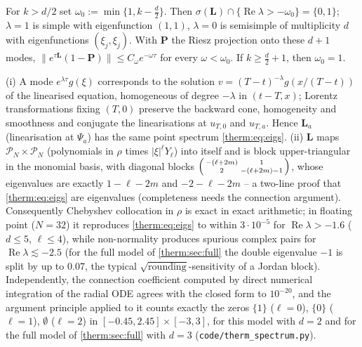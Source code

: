 \begin{corollary}\label{therm:cor:gap}
For $k>d/2$ set $\omega_0:=\min\{1,k-\frac d2\}$.  Then
$\sigma(\mathbf L)\cap\{\operatorname{Re}\lambda>-\omega_0\}=\{0,1\}$; $\lambda=1$ is simple with eigenfunction
$(1,1)$, $\lambda=0$ is semisimple of multiplicity $d$ with eigenfunctions
$(\xi_j,\xi_j)$.  With $\mathbf P$ the Riesz projection onto these $d+1$ modes,
$\|e^{\tau\mathbf L}(1-\mathbf P)\|\le C_\omega e^{-\omega\tau}$ for every $\omega<\omega_0$.  If $k\ge\frac d2+1$,
then $\omega_0=1$.
\end{corollary}

\begin{remark}\label{therm:rem:numspec}
(i) A mode $e^{\lambda\tau}g(\xi)$ corresponds to the solution
$v=(T-t)^{-\lambda}g(x/(T-t))$ of the linearised equation, homogeneous of degree
$-\lambda$ in $(t-T,x)$; Lorentz transformations fixing $(T,0)$ preserve the
backward cone, homogeneity and smoothness and conjugate the linearisations at
$u_{T,0}$ and $u_{T,a}$.  Hence $\mathbf L_a$ (linearisation at $\Psi_a$) has the same
point spectrum \cref{therm:eq:eigs}.
(ii) $\mathbf L$ maps $\mathcal P_N\times\mathcal P_N$ (polynomials in $\rho$ times
$|\xi|^\ell Y_\ell$) into itself and is block upper-triangular in the monomial
basis, with diagonal blocks $\begin{psmallmatrix}-(\ell+2m)&1\\2&-(\ell+2m)-1\end{psmallmatrix}$, whose
eigenvalues are exactly $1-\ell-2m$ and $-2-\ell-2m$ -- a two-line proof that
\cref{therm:eq:eigs} are eigenvalues (completeness needs the connection
argument).  Consequently Chebyshev collocation in $\rho$ is exact in exact
arithmetic; in floating point ($N=32$) it reproduces \cref{therm:eq:eigs} to within
$3\cdot10^{-5}$ for $\operatorname{Re}\lambda>-1.6$ ($d\le5$, $\ell\le4$), while non-normality produces
spurious complex pairs for $\operatorname{Re}\lambda\lesssim-2.5$ (for the full model of
\cref{therm:sec:full} the double eigenvalue $-1$ is split by up to $0.07$, the typical
$\sqrt{\text{rounding}}$-sensitivity of a Jordan block).  Independently, the connection coefficient computed
by direct numerical integration of the radial ODE agrees with the closed form to
$10^{-20}$, and the argument principle applied to it counts exactly the zeros
$\{1\}$ ($\ell=0$), $\{0\}$ ($\ell=1$), $\emptyset$ ($\ell=2$) in
$[-0.45,2.45]\times[-3,3]$, for this model with $d=2$ and for the full model of
\cref{therm:sec:full} with $d=3$ (\texttt{code/therm\_spectrum.py}).
\end{remark}

